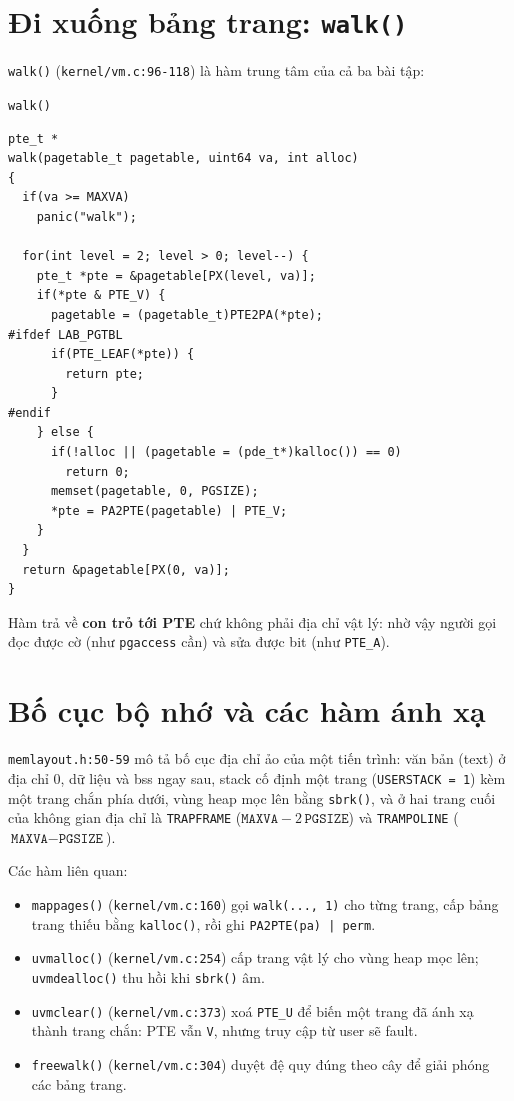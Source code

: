 \section{Đi xuống bảng trang: \texttt{walk()}}

\texttt{walk()} (\texttt{kernel/vm.c:96-118}) là hàm trung tâm của cả ba bài tập:

\begin{codebox}[walk]{\texttt{walk()}}
    \begin{verbatim}
pte_t *
walk(pagetable_t pagetable, uint64 va, int alloc)
{
  if(va >= MAXVA)
    panic("walk");

  for(int level = 2; level > 0; level--) {
    pte_t *pte = &pagetable[PX(level, va)];
    if(*pte & PTE_V) {
      pagetable = (pagetable_t)PTE2PA(*pte);
#ifdef LAB_PGTBL
      if(PTE_LEAF(*pte)) {
        return pte;
      }
#endif
    } else {
      if(!alloc || (pagetable = (pde_t*)kalloc()) == 0)
        return 0;
      memset(pagetable, 0, PGSIZE);
      *pte = PA2PTE(pagetable) | PTE_V;
    }
  }
  return &pagetable[PX(0, va)];
}
    \end{verbatim}
\end{codebox}

Hàm trả về \textbf{con trỏ tới PTE} chứ không phải địa chỉ vật lý: nhờ vậy người gọi đọc được cờ (như \texttt{pgaccess} cần) và sửa được bit (như \texttt{PTE\_A}).

\section{Bố cục bộ nhớ và các hàm ánh xạ}

\texttt{memlayout.h:50-59} mô tả bố cục địa chỉ ảo của một tiến trình: văn bản (text) ở địa chỉ 0, dữ liệu và bss ngay sau, stack cố định một trang (\texttt{USERSTACK = 1}) kèm một trang chắn phía dưới, vùng heap mọc lên bằng \texttt{sbrk()}, và ở hai trang cuối của không gian địa chỉ là \texttt{TRAPFRAME} ($\texttt{MAXVA} - 2\,\texttt{PGSIZE}$) và \texttt{TRAMPOLINE} ($\texttt{MAXVA} - \texttt{PGSIZE}$).

Các hàm liên quan:

\begin{itemize}[itemsep=0pt, topsep=2.5pt, leftmargin=1.5cm]
    \item \texttt{mappages()} (\texttt{kernel/vm.c:160}) gọi \texttt{walk(..., 1)} cho từng trang, cấp bảng trang thiếu bằng \texttt{kalloc()}, rồi ghi \texttt{PA2PTE(pa) | perm}.
    \item \texttt{uvmalloc()} (\texttt{kernel/vm.c:254}) cấp trang vật lý cho vùng heap mọc lên; \texttt{uvmdealloc()} thu hồi khi \texttt{sbrk()} âm.
    \item \texttt{uvmclear()} (\texttt{kernel/vm.c:373}) xoá \texttt{PTE\_U} để biến một trang đã ánh xạ thành trang chắn: PTE vẫn \texttt{V}, nhưng truy cập từ user sẽ fault.
    \item \texttt{freewalk()} (\texttt{kernel/vm.c:304}) duyệt đệ quy đúng theo cây để giải phóng các bảng trang.
\end{itemize}

